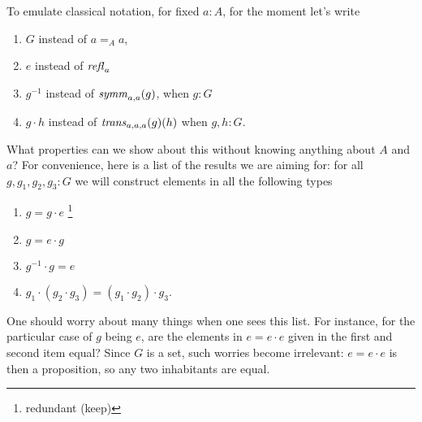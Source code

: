  To emulate classical notation, for fixed $a:A$,  for the moment let's write 
 \begin{enumerate}
 \item $G$ instead of $a=_Aa$,
 \item $e$ instead of $\mathop{{\it refl}_{a}}{}$
 \item $g^{-1}$ instead of $\mathop{\mathit{symm}}_{a,a}(g)$, when $g:G$
 \item $g\cdot h$ instead of $\mathop{\mathit{trans}}_{a,a,a}(g)(h)$ when $g,h:G$.
 \end{enumerate}
 What properties can we show about this without knowing anything about $A$ and $a$? For convenience, here is a list of the results we are aiming for: for all $g,g_1,g_2,g_3:G$ we will construct elements in all the following types 
 \begin{enumerate}
 \item $g=g\cdot e$ \footnote{redundant (keep)}
 \item $g=e\cdot g$
 \item $g^{-1}\cdot g=e$
 \item $g_1\cdot(g_2\cdot g_3)=(g_1\cdot g_2)\cdot g_3$.
 \end{enumerate}
 \begin{remark}
   One should worry about many things when one sees this list.  For instance, for the particular case of $g$ being $e$, are the elements in $e=e\cdot e$ given in the first and second item equal?  Since $G$ is a set, such worries become irrelevant: $e=e\cdot e$ is then a proposition, so any two inhabitants are equal.
 \end{remark}


